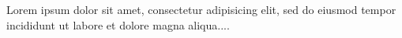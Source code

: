 Lorem ipsum dolor sit amet, consectetur adipisicing elit, sed do eiusmod tempor incididunt ut labore et dolore magna aliqua....\\
